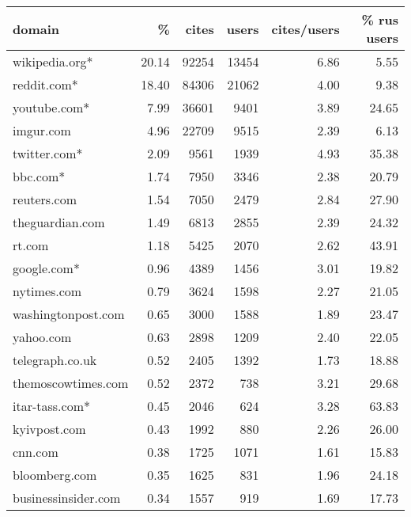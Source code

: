 \begin{tabular}{lrrrrr}
\toprule
domain &       \% &   cites &   users &  cites/users &  \% rus users \\
\midrule
wikipedia.org*      &   20.14 &   92254 &   13454 &         6.86 &         5.55 \\
reddit.com*         &   18.40 &   84306 &   21062 &         4.00 &         9.38 \\
youtube.com*        &    7.99 &   36601 &    9401 &         3.89 &        24.65 \\
imgur.com           &    4.96 &   22709 &    9515 &         2.39 &         6.13 \\
twitter.com*        &    2.09 &    9561 &    1939 &         4.93 &        35.38 \\
bbc.com*            &    1.74 &    7950 &    3346 &         2.38 &        20.79 \\
reuters.com         &    1.54 &    7050 &    2479 &         2.84 &        27.90 \\
theguardian.com     &    1.49 &    6813 &    2855 &         2.39 &        24.32 \\
rt.com              &    1.18 &    5425 &    2070 &         2.62 &        43.91 \\
google.com*         &    0.96 &    4389 &    1456 &         3.01 &        19.82 \\
nytimes.com         &    0.79 &    3624 &    1598 &         2.27 &        21.05 \\
washingtonpost.com  &    0.65 &    3000 &    1588 &         1.89 &        23.47 \\
yahoo.com           &    0.63 &    2898 &    1209 &         2.40 &        22.05 \\
telegraph.co.uk     &    0.52 &    2405 &    1392 &         1.73 &        18.88 \\
themoscowtimes.com  &    0.52 &    2372 &     738 &         3.21 &        29.68 \\
itar-tass.com*      &    0.45 &    2046 &     624 &         3.28 &        63.83 \\
kyivpost.com        &    0.43 &    1992 &     880 &         2.26 &        26.00 \\
cnn.com             &    0.38 &    1725 &    1071 &         1.61 &        15.83 \\
bloomberg.com       &    0.35 &    1625 &     831 &         1.96 &        24.18 \\
businessinsider.com &    0.34 &    1557 &     919 &         1.69 &        17.73 \\

\end{tabular}
